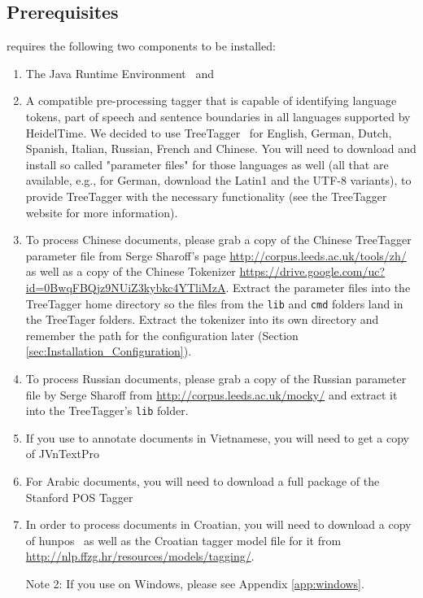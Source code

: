 \subsection{Prerequisites}\label{sec:Installation_Prerequisites}
\product{} requires the following two components to be installed:
\begin{enumerate}
\item The Java Runtime Environment~\cite{Java} and
\item A compatible pre-processing tagger that is capable of identifying language tokens, part of speech and sentence boundaries in all languages supported by HeidelTime. We decided to use TreeTagger~\cite{TreeTagger} for English, German, Dutch, Spanish, Italian, Russian, French and Chinese. You will need to download and install so called "parameter files" for those languages as well (all that are available, e.g., for German, download the Latin1 and the UTF-8 variants), to provide TreeTagger with the necessary functionality (see the TreeTagger website for more information).
\item To process Chinese documents, please grab a copy of the Chinese TreeTagger parameter file from Serge Sharoff's page \url{http://corpus.leeds.ac.uk/tools/zh/} as well as a copy of the Chinese Tokenizer \url{https://drive.google.com/uc?id=0BwqFBQjz9NUiZ3kybkc4YTliMzA}. Extract the parameter files into the TreeTagger home directory so the files from the \texttt{lib} and \texttt{cmd} folders land in the TreeTager folders. Extract the tokenizer into its own directory and remember the path for the configuration later (Section \ref{sec:Installation_Configuration}).
\item To process Russian documents, please grab a copy of the Russian parameter file by Serge Sharoff from \url{http://corpus.leeds.ac.uk/mocky/} and extract it into the TreeTagger's \texttt{lib} folder.
\item If you use \product{} to annotate documents in Vietnamese, you will need to get a copy of JVnTextPro~\cite{JVnTextPro}
\item For Arabic documents, you will need to download a full package of the Stanford POS Tagger~\cite{StanfordPOSTagger}
\item In order to process documents in Croatian, you will need to download a copy of hunpos~\cite{hunpos} as well as the Croatian tagger model file for it from \url{http://nlp.ffzg.hr/resources/models/tagging/}.

Note 2: If you use \product{} on Windows, please see Appendix \ref{app:windows}.
\end{enumerate}

